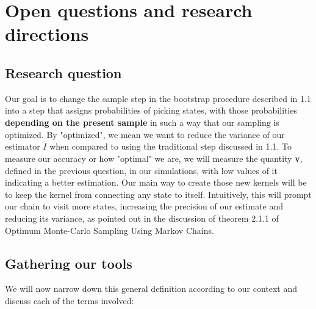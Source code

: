 

\section{Open questions and research directions}

\subsection{Research question}

Our goal is to change the sample step in the bootstrap procedure described in 1.1 into a step that assigns probabilities of picking states, with those probabilities \textbf{depending on the present sample} in such a way that our sampling is optimized. By "optimized", we mean we want to reduce the variance of our estimator $\tilde{I}$ when compared to using the traditional step discussed in 1.1. To measure our accuracy or how "optimal" we are, we will measure the quantity \textbf{v}, defined in the previous question, in our simulations, with low values of it indicating a better estimation. Our main way to create those new kernels will be to keep the kernel from connecting any state to itself. Intuitively, this will prompt our chain to visit more states, increasing the precision of our estimate and reducing its variance, as pointed out in the discussion of theorem 2.1.1 of Optimum Monte-Carlo Sampling Using Markov Chains.

\subsection{Gathering our tools}
We will now narrow down this general definition according to our context and discuss each of the terms involved:

